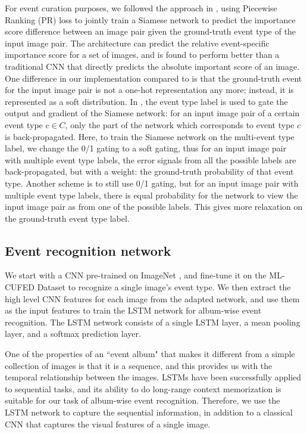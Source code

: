 \documentclass[runningheads]{llncs}
\begin{document}
For event curation purposes, we followed the approach in \cite{CVPR}, using Piecewise Ranking (PR) loss to jointly train a Siamese network to predict the importance score difference between an image pair given the ground-truth event type of the input image pair. The architecture can predict the relative event-specific importance score for a set of images, and is found to perform better than a traditional CNN that directly predicts the absolute important score of an image.
One difference in our implementation compared to \cite{CVPR} is that the ground-truth event for the input image pair  is not a one-hot representation any more; instead, it is represented as a soft distribution. In \cite{CVPR}, the event type label is used to gate the output and gradient of the Siamese network: for an input image pair of a certain event type $c \in C$, only the part of the network which corresponds to event type $c$ is back-propagated.  Here, to train the Siamese network on the multi-event type label, we change the 0/1 gating to a soft gating, thus for an input image pair with multiple event type labels, the error signals from all the possible labels are back-propagated, but with a weight: the ground-truth probability of that event type. Another scheme is to still use 0/1 gating, but for an input image pair with multiple event type labels, there is equal probability for the network to view the input image pair as from one of the possible labels. This gives more relaxation on the ground-truth event type label.
\subsection{Event recognition network}

We start with a CNN pre-trained on ImageNet \cite{caffe} \cite{imagenet}, and fine-tune it on the ML-CUFED Dataset to recognize a single image's event type. We then extract the high level CNN features for each image from the adapted network, and use them as the input features to train the LSTM network for album-wise event recognition. The LSTM network consists of a single LSTM layer, a mean pooling layer, and a softmax prediction layer. 

One of the properties of  an ``event album" that makes it different from a simple collection of images is that it is a sequence, and this provides us with the temporal relationship between the images. LSTMs have been successfully applied to sequential tasks, and its ability to do long-range context memorization is suitable for our task of album-wise event recognition. Therefore, we use the LSTM network to capture the sequential information, in addition to a classical CNN that captures the visual features of a single image. 
\end{document}
